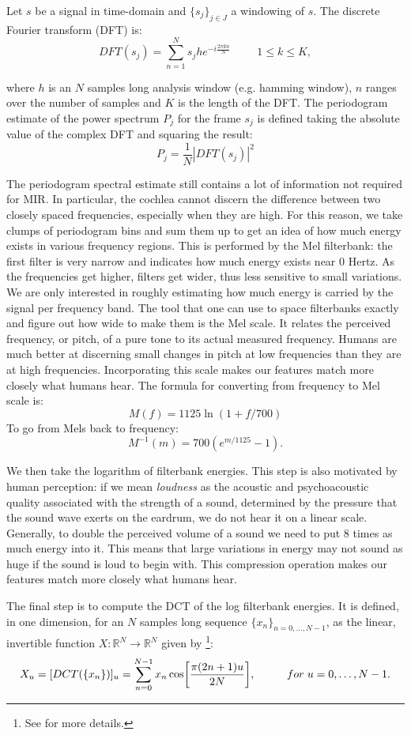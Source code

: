 \documentclass[english, LaM, oneside, noexaminfo]{sapthesis}
\begin{document}
Let $s$ be a signal in time-domain and $\{s_j\}_{j\in J}$ a windowing of $s$. The discrete Fourier transform (DFT) is: $$DFT(s_j) = \sum_{n=1}^N s_jhe^{-i\frac{2\pi kn}{N}} \hspace{1cm} 1 \leq k \leq K,$$

\noindent where $h$ is an $N$ samples long analysis window (e.g. hamming window), $n$ ranges over the number of samples and $K$ is the length of the DFT. The periodogram estimate of the power spectrum $P_j$ for the frame $s_j$ is defined taking the absolute value of the complex DFT and squaring the result: $$P_j = \frac{1}{N} |DFT(s_j)|^2$$

The periodogram spectral estimate still contains a lot of information not required for MIR. In particular, the cochlea cannot discern the difference between two closely spaced frequencies, especially when they are high. For this reason, we take clumps of periodogram bins and sum them up to get an idea of how much energy exists in various frequency regions. This is performed by the Mel filterbank: the first filter is very narrow and indicates how much energy exists near 0 Hertz. As the frequencies get higher, filters get wider, thus less sensitive to small variations. We are only interested in roughly estimating how much energy is carried by the signal per frequency band. The tool that one can use to space filterbanks exactly and figure out how wide to make them is the Mel scale.
It relates the perceived frequency, or pitch, of a pure tone to its actual measured frequency. Humans are much better at discerning small changes in pitch at low frequencies than they are at high frequencies. Incorporating this scale makes our features match more closely what humans hear. The formula for converting from frequency to Mel scale is:
$$M(f) = 1125 \ln(1+f/700)$$
To go from Mels back to frequency:
$$M^{-1}(m) = 700 (e^{m/1125}-1).$$

We then take the logarithm of filterbank energies. This step is also motivated by human perception: if we mean \textit{loudness} as the acoustic and psychoacoustic quality associated with the strength of a sound, determined by the pressure that the sound wave exerts on the eardrum, we do not hear it on a linear scale. Generally, to double the perceived volume of a sound we need to put 8 times as much energy into it. This means that large variations in energy may not sound as huge if the sound is loud to begin with. This compression operation makes our features match more closely what humans hear.

The final step is to compute the DCT of the log filterbank energies. It is defined, in one dimension, for an $N$ samples long sequence $\{x_n\}_{n=0,...,N-1}$, as the linear, invertible function $X: \mathbb{R}^N \rightarrow \mathbb{R}^N$ given by \footnote{See \cite{khayam2003discrete} for more details.}:
$$X_u=[DCT(\{x_n\})]_u = \sum_{n=0}^{N-1} x_n \cos \biggl[\frac{\pi (2n+1)u}{2N} \biggl], \hspace{1cm} for \hspace{0.1cm} u=0,\dots,N-1.$$
\end{document}

